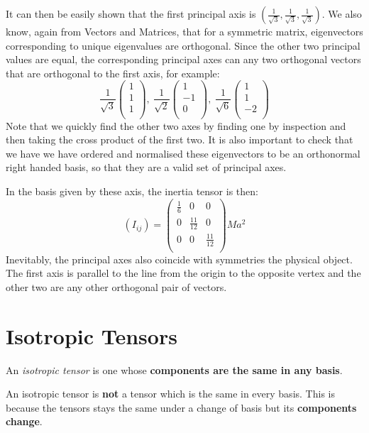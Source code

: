 \documentclass[../main.tex]{subfiles}
\begin{document}
It can then be easily shown that the first principal axis is $(\frac{1}{\sqrt{3}}, \frac{1}{\sqrt{3}}, \frac{1}{\sqrt{3}})$.
We also know, again from Vectors and Matrices, that for a symmetric matrix, eigenvectors corresponding to unique eigenvalues are orthogonal.
Since the other two principal values are equal, the corresponding principal axes can any two orthogonal vectors that are orthogonal to the first axis, for example:
\[
  \frac{1}{\sqrt{3}}\begin{pmatrix}
  1 \\
  1 \\
  1 \\
  \end{pmatrix},\ \frac{1}{\sqrt{2}}\begin{pmatrix}
  1 \\
  -1 \\
  0 \\
  \end{pmatrix},\ \frac{1}{\sqrt{6}} \begin{pmatrix}
  1 \\
  1 \\
  -2 \\
  \end{pmatrix}
\]
Note that we quickly find the other two axes by finding one by inspection and then taking the cross product of the first two.
It is also important to check that we have we have ordered and normalised these eigenvectors to be an orthonormal right handed basis, so that they are a valid set of principal axes.

In the basis given by these axis, the inertia tensor is then:
\[
  (I_{i j}) = \begin{pmatrix}
  \frac{1}{6} & 0 & 0 \\
  0 & \frac{11}{12} & 0 \\
  0 & 0 & \frac{11}{12} \\
  \end{pmatrix}Ma^2
\]
Inevitably, the principal axes also coincide with symmetries the physical object.
The first axis is parallel to the line from the origin to the opposite vertex and the other two are any other orthogonal pair of vectors.
\section{Isotropic Tensors}
\begin{definition}
  An \textit{isotropic tensor} is one whose \textbf{components are the same in any basis}.
\end{definition}
\begin{remark}[Warning]
  An isotropic tensor is \textbf{not} a tensor which is the same in every basis.
  This is because the tensors stays the same under a change of basis but its \textbf{components change}.
\end{remark}
\end{document}
